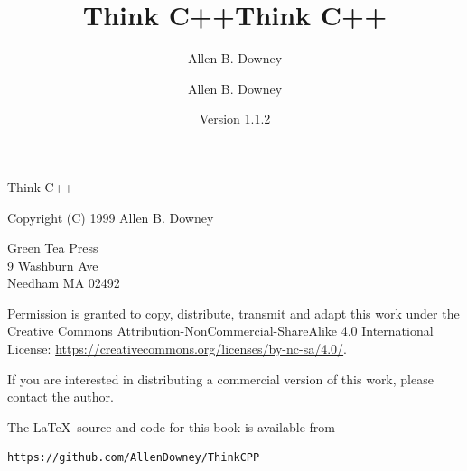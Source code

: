 \documentclass{book}
\title{Think C++}
\author{Allen B. Downey}
\date{}
\begin{document}
\title {Think C++}
\author {Allen B. Downey}
\date {Version 1.1.2}
\maketitle

\vspace{2in}
\begin{center}
{\Large Think C++}

\vspace{0.25in}

Copyright (C) 1999  Allen B. Downey
\end{center}
\vspace{0.25in}

\begin{flushleft}
Green Tea Press       \\
9 Washburn Ave \\
Needham MA 02492
\end{flushleft}

Permission is granted to copy, distribute, transmit and adapt this
work under the Creative Commons Attribution-NonCommercial-ShareAlike 4.0
International License: \url{https://creativecommons.org/licenses/by-nc-sa/4.0/}.

If you are interested in distributing a commercial version of this
work, please contact the author.

The \LaTeX\ source and code for this book is available from

\begin{verbatim}
https://github.com/AllenDowney/ThinkCPP
\end{verbatim}



\frontmatter
\tableofcontents

\mainmatter
















\appendix


\printindex
\end{document}
